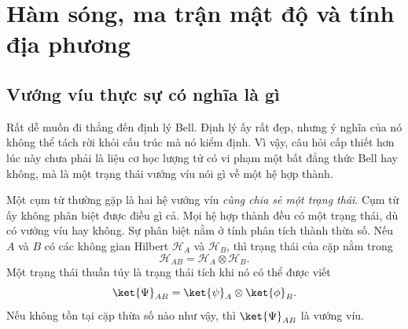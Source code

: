 \chapter{Hàm sóng, ma trận mật độ và tính địa phương}


\section{Vướng víu thực sự có nghĩa là gì}

Rất dễ muốn đi thẳng đến định lý Bell. Định lý ấy rất đẹp, nhưng ý nghĩa của nó không thể tách rời khỏi cấu trúc mà nó kiểm định. Vì vậy, câu hỏi cấp thiết hơn lúc này chưa phải là liệu cơ học lượng tử có vi phạm một bất đẳng thức Bell hay không, mà là một trạng thái vướng víu nói gì về một hệ hợp thành.

Một cụm từ thường gặp là hai hệ vướng víu \emph{cùng chia sẻ một trạng thái}. Cụm từ ấy không phân biệt được điều gì cả. Mọi hệ hợp thành đều có một trạng thái, dù có vướng víu hay không. Sự phân biệt nằm ở tính phân tích thành thừa số. Nếu \(A\) và \(B\) có các không gian Hilbert \(\mathcal H_A\) và \(\mathcal H_B\), thì trạng thái của cặp nằm trong
\begin{equation}
\mathcal H_{AB}=\mathcal H_A\otimes\mathcal H_B.
\end{equation}
Một trạng thái thuần túy là trạng thái tích khi nó có thể được viết
\begin{equation}
\ket{\Psi}_{AB}=\ket{\psi}_A\otimes\ket{\phi}_B.
\label{eq:l7-product-state}
\end{equation}
Nếu không tồn tại cặp thừa số nào như vậy, thì \(\ket{\Psi}_{AB}\) là vướng víu.

